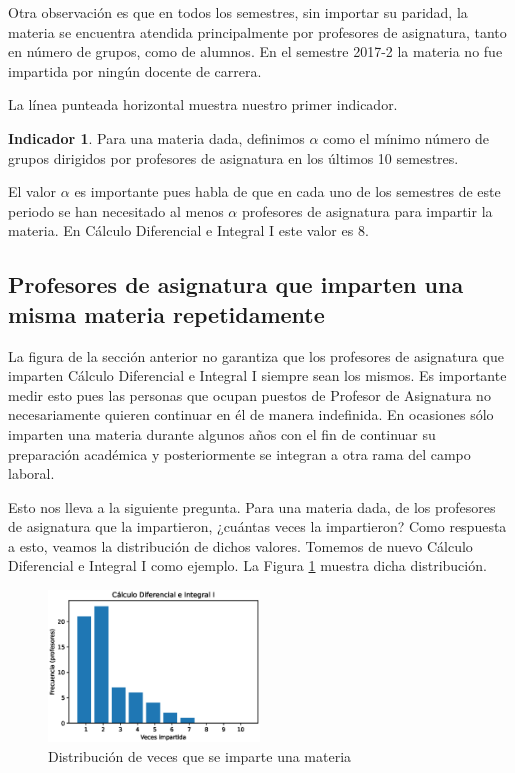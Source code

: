 \documentclass[twocolumn]{article}
\theoremstyle{definition}
\newtheorem{indicador}{Indicador}
\begin{document}
Otra observación es que en todos los semestres, sin importar su paridad, la materia se encuentra atendida principalmente por profesores de asignatura, tanto en número de grupos, como de alumnos. En el semestre 2017-2 la materia no fue impartida por ningún docente de carrera.

La línea punteada horizontal muestra nuestro primer indicador. 

\begin{indicador} Para una materia dada, definimos $\alpha$ como el mínimo número de grupos dirigidos por profesores de asignatura en los últimos 10 semestres.
\end{indicador}

 El valor $\alpha$ es importante pues habla de que en cada uno de los semestres de este periodo se han necesitado al menos $\alpha$ profesores de asignatura para impartir la materia. En Cálculo Diferencial e Integral I este valor es $8$.
 
 \subsection{Profesores de asignatura que imparten una misma materia repetidamente}

La figura de la sección anterior no garantiza que los profesores de asignatura que imparten Cálculo Diferencial e Integral I siempre sean los mismos. Es importante medir esto pues las personas que ocupan puestos de Profesor de Asignatura no necesariamente quieren continuar en él de manera indefinida. En ocasiones sólo imparten una materia durante algunos años con el fin de continuar su preparación académica y posteriormente se integran a otra rama del campo laboral.

Esto nos lleva a la siguiente pregunta. Para una materia dada, de los profesores de asignatura que la impartieron, ¿cuántas veces la impartieron? Como respuesta a esto, veamos la distribución de dichos valores. Tomemos de nuevo Cálculo Diferencial e Integral I como ejemplo. La Figura \ref{fig:calchist} muestra dicha distribución.

\begin{figure}
    \centering
    \includegraphics[width=0.5\textwidth]{fig/dist_calculo.eps}
    \caption{Distribución de veces que se imparte una materia}
    \label{fig:calchist}
\end{figure}
\end{document}
